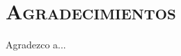 
\cleardoublepage
\thispagestyle{plain}
{}
\chapter*{\normalfont\scshape{Agradecimientos}}

\begin{center}
    \vspace*{\fill}

    \begin{minipage}{0.7\textwidth}
        Agradezco a...
    \end{minipage}

    \vspace*{\fill}

\end{center}
